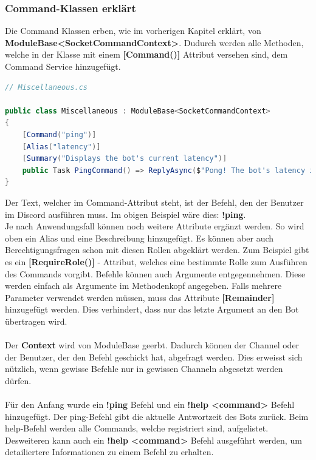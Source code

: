 \documentclass[a4paper, table]{article}
\begin{document}
\subsubsection*{Command-Klassen erklärt}
Die Command Klassen erben, wie im vorherigen Kapitel erklärt, von \textbf{ModuleBase<SocketCommandContext>}.
Dudurch werden alle Methoden, welche in der Klasse mit einem \textbf{[Command()]} Attribut versehen sind,
dem Command Service hinzugefügt.

\begin{lstlisting}[language=csharp]
// Miscellaneous.cs

public class Miscellaneous : ModuleBase<SocketCommandContext>
{
    [Command("ping")]
    [Alias("latency")]
    [Summary("Displays the bot's current latency")]
    public Task PingCommand() => ReplyAsync($"Pong! The bot's latency is {Context.Client.Latency} ms.");
}
\end{lstlisting}

Der Text, welcher im Command-Attribut steht, ist der Befehl, den der Benutzer im Discord ausführen muss.
Im obigen Beispiel wäre dies: \textbf{!ping}.\\
Je nach Anwendungsfall können noch weitere Attribute ergänzt werden.
So wird oben ein Alias und eine Beschreibung hinzugefügt.
Es können aber auch Berechtigungsfragen schon mit diesen Rollen abgeklärt werden.
Zum Beispiel gibt es ein \textbf{[RequireRole()]} - Attribut, welches eine bestimmte Rolle zum Ausführen des Commands vorgibt.
Befehle können auch Argumente entgegennehmen.
Diese werden einfach als Argumente im Methodenkopf angegeben.
Falls mehrere Parameter verwendet werden müssen, muss das Attribute \textbf{[Remainder]} hinzugefügt werden.
Dies verhindert, dass nur das letzte Argument an den Bot übertragen wird.\\\\
Der \textbf{Context} wird von ModuleBase geerbt.
Dadurch können der Channel oder der Benutzer, der den Befehl geschickt hat, abgefragt werden.
Dies erweisst sich nützlich, wenn gewisse Befehle nur in gewissen Channeln abgesetzt werden dürfen.\\\\
Für den Anfang wurde ein \textbf{!ping} Befehl und ein \textbf{!help <command>} Befehl hinzugefügt.
Der ping-Befehl gibt die aktuelle Antwortzeit des Bots zurück.
Beim help-Befehl werden alle Commands, welche registriert sind, aufgelistet.
Desweiteren kann auch ein \textbf{!help <command>} Befehl ausgeführt werden, um detailiertere Informationen zu einem Befehl zu erhalten.
\end{document}
